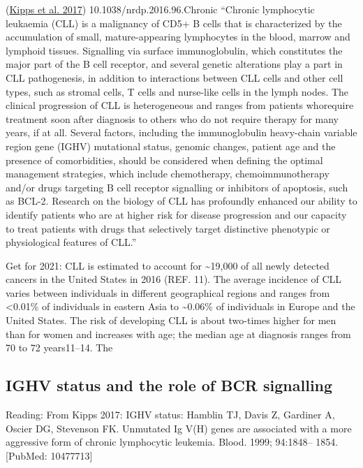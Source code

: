 \documentclass[11pt, a4paper, twosided]{book}
\begin{document}
(\protect\hyperlink{ref-Kipps2017}{Kipps et al. 2017}) 10.1038/nrdp.2016.96.Chronic
``Chronic lymphocytic leukaemia (CLL) is a malignancy of CD5+ B cells that is characterized by the accumulation of small, mature-appearing lymphocytes in the blood, marrow and lymphoid tissues. Signalling via surface immunoglobulin, which constitutes the major part of the B cell receptor, and several genetic alterations play a part in CLL pathogenesis, in addition to interactions between CLL cells and other cell types, such as stromal cells, T cells and nurse-like cells in the lymph nodes. The clinical progression of CLL is heterogeneous and ranges from patients whorequire treatment soon after diagnosis to others who do not require therapy for many years, if at all. Several factors, including the immunoglobulin heavy-chain variable region gene (IGHV) mutational status, genomic changes, patient age and the presence of comorbidities, should be considered when defining the optimal management strategies, which include chemotherapy, chemoimmunotherapy and/or drugs targeting B cell receptor signalling or inhibitors of apoptosis, such as BCL-2. Research on the biology of CLL has profoundly enhanced our ability to identify patients who are at higher risk for disease progression and our capacity to treat patients with drugs that selectively target distinctive phenotypic or physiological features of CLL.''

Get for 2021:
CLL is estimated to account for \textasciitilde19,000 of all newly detected cancers in the United States in 2016 (REF. 11). The average incidence of CLL varies between individuals in different geographical regions and ranges from \textless0.01\% of individuals in eastern Asia to \textasciitilde0.06\% of individuals in Europe and the United States. The risk of developing CLL is about two-times higher for men than for women and increases with age; the median age at diagnosis ranges from 70 to 72 years11--14.
The

\hypertarget{ighv-status-and-the-role-of-bcr-signalling}{%
\subsection{IGHV status and the role of BCR signalling}\label{ighv-status-and-the-role-of-bcr-signalling}}

Reading:
From Kipps 2017:
IGHV status:
Hamblin TJ, Davis Z, Gardiner A, Oscier DG, Stevenson FK. Unmutated Ig V(H) genes are associated with a more aggressive form of chronic lymphocytic leukemia. Blood. 1999; 94:1848-- 1854. {[}PubMed: 10477713{]}
\end{document}
